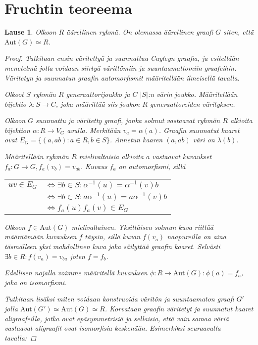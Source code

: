 \documentclass[a4paper, 12pt]{article}
\theoremstyle{definition}
\theoremstyle{plain}
\newtheorem{teor}[mydef]{Lause}
\begin{document}
\newpage

\section{Fruchtin teoreema}

\begin{teor}
\label{frucht}
Olkoon $R$ äärellinen ryhmä. On olemassa äärellinen graafi $G$ siten, että $\mathrm{Aut}(G) \simeq R$.
\begin{proof}
Tutkitaan ensin väritettyä ja suunnattua Cayleyn graafia, ja esitellään menetelmä jolla voidaan siirtyä värittömiin ja suuntaamattomiin graafeihin. Väritetyn ja suunnatun graafin automorfismit määritellään ilmeisellä tavalla.

Olkoot $S$ ryhmän $R$ generaattorijoukko ja $C$ $|S|$:n värin joukko. Määri\-tellään bijektio $\lambda: S \rightarrow C$, joka määrittää siis joukon $R$ generaattoreiden värityksen.

Olkoon $G$ suunnattu ja väritetty graafi, jonka solmut vastaavat ryhmän $R$ alkioita bijektion $\alpha: R \rightarrow V_G$ avulla. Merkitään $v_a = \alpha(a)$. Graafin suunnatut kaaret ovat $E_G = \{ (a, ab) : a \in R, b \in S\}$. Annetun kaaren $(a, ab)$ väri on $\lambda(b)$.

Määritellään ryhmän $R$ mielivaltaisia alkioita $a$ vastaavat kuvaukset $f_a: G \rightarrow G, f_a(v_b) = v_{ab}$. Kuvaus $f_a$ on automorfismi, sillä
\begin{center}
\begin{tabular}{r l}
$uv \in E_G$ & $\Leftrightarrow \exists b \in S: \alpha^{-1}(u) = \alpha^{-1}(v)b$ \\
& $\Leftrightarrow \exists b \in S: a\alpha^{-1}(u) = a\alpha^{-1}(v)b$ \\
& $\Leftrightarrow f_a(u)f_a(v) \in E_G$\\
\end{tabular}
\end{center}

Olkoon $f \in \mathrm{Aut}(G)$ mielivaltainen. Yksittäisen solmun kuva riittää mää\-rää\-mään kuvauksen $f$ täysin, sillä kuvan $f(v_a)$ naapureilla on aina täsmälleen yksi mahdollinen kuva joka säilyttää graafin kaaret. Selvästi $\exists b \in R: f(v_a) = v_{ba}$ joten $f = f_b$.

Edellisen nojalla voimme määritellä kuvauksen $\phi: R \rightarrow \mathrm{Aut}(G): \phi(a) = f_a$, joka on isomorfismi.

Tutkitaan lisäksi miten voidaan konstruoida väritön ja suuntaamaton graafi $G'$ jolla $\mathrm{Aut}(G') \simeq \mathrm{Aut}(G) \simeq R$. 
Korvataan graafin väritetyt ja suunnatut kaaret aligraafeilla, jotka ovat epäsymmetrisiä ja sellaisia, että vain samaa väriä vastaavat aligraafit ovat isomorfisia keskenään. Esimerkiksi seuraavalla tavalla:


\end{proof}
\end{teor}
\end{document}
